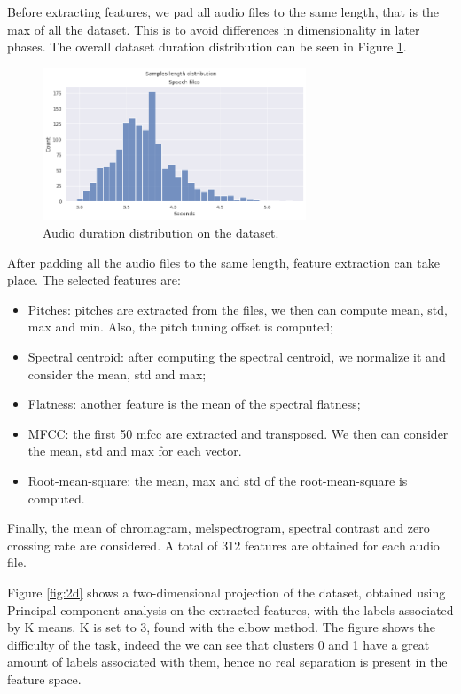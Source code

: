 Before extracting features, we pad all audio files to the same length, 
that is the max of all the dataset. 
This is to avoid differences in dimensionality in later phases. The overall 
dataset duration distribution can be seen in Figure \ref{fig:dur}.

\begin{figure}
  \begin{center}
    \includegraphics[width=0.7\textwidth]{images/duration.png}
    \caption{Audio duration distribution on the dataset.} \label{fig:dur}
  \end{center}
\end{figure}

\noindent After padding all the audio files to the same length, feature
extraction can take place.
The selected features are:
\begin{itemize}
  \item Pitches: pitches are extracted from the 
  files, we then can compute mean, std, max and min. Also, the pitch tuning offset is computed;
  \item Spectral centroid: after computing the spectral centroid, we normalize it
  and consider the mean, std and max;
  \item Flatness: another feature is the mean of the spectral flatness;
  \item MFCC: the first 50 mfcc are extracted and transposed. We then can consider
  the mean, std and max for each vector.
  \item Root-mean-square: the mean, max and std of the root-mean-square is computed.
\end{itemize} 
Finally, the mean of chromagram, melspectrogram, spectral contrast and zero crossing rate 
are considered.
A total of 312 features are obtained for each audio file. 

\noindent Figure \ref{fig:2d} shows a two-dimensional projection of the dataset, 
obtained using Principal component analysis on the extracted features, with the labels associated by K means.
K is set to $3$, found with the elbow method. The figure shows the difficulty of the task, indeed the 
we can see that clusters 0 and 1 have a great amount of labels associated with them, hence no 
real separation is present in the feature space.

